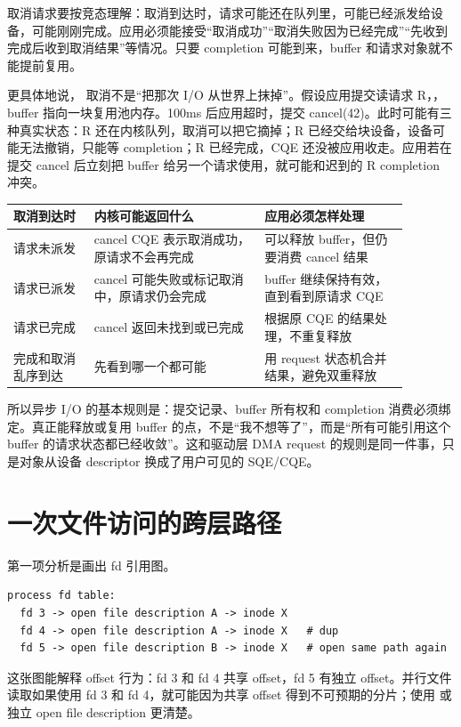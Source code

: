 取消请求要按竞态理解：取消到达时，请求可能还在队列里，可能已经派发给设备，可能刚刚完成。应用必须能接受“取消成功”“取消失败因为已经完成”“先收到完成后收到取消结果”等情况。只要 completion 可能到来，buffer 和请求对象就不能提前复用。

更具体地说， 取消不是“把那次 I/O 从世界上抹掉”。假设应用提交读请求 R，，buffer 指向一块复用池内存。100ms 后应用超时，提交 cancel(42)。此时可能有三种真实状态：R 还在内核队列，取消可以把它摘掉；R 已经交给块设备，设备可能无法撤销，只能等 completion；R 已经完成，CQE 还没被应用收走。应用若在提交 cancel 后立刻把 buffer 给另一个请求使用，就可能和迟到的 R completion 冲突。

\begin{longtable}{|p{0.18\linewidth}|p{0.38\linewidth}|p{0.32\linewidth}|}
\toprule
取消到达时 & 内核可能返回什么 & 应用必须怎样处理 \\
\midrule
请求未派发 & cancel CQE 表示取消成功，原请求不会再完成 & 可以释放 buffer，但仍要消费 cancel 结果 \\\tablerowrule
请求已派发 & cancel 可能失败或标记取消中，原请求仍会完成 & buffer 继续保持有效，直到看到原请求 CQE \\\tablerowrule
请求已完成 & cancel 返回未找到或已完成 & 根据原 CQE 的结果处理，不重复释放 \\\tablerowrule
完成和取消乱序到达 & 先看到哪一个都可能 & 用 request 状态机合并结果，避免双重释放 \\
\bottomrule
\end{longtable}

所以异步 I/O 的基本规则是：提交记录、buffer 所有权和 completion 消费必须绑定。真正能释放或复用 buffer 的点，不是“我不想等了”，而是“所有可能引用这个 buffer 的请求状态都已经收敛”。这和驱动层 DMA request 的规则是同一件事，只是对象从设备 descriptor 换成了用户可见的 SQE/CQE。

\section{一次文件访问的跨层路径}

第一项分析是画出 fd 引用图。

\begin{lstlisting}
process fd table:
  fd 3 -> open file description A -> inode X
  fd 4 -> open file description A -> inode X   # dup
  fd 5 -> open file description B -> inode X   # open same path again
\end{lstlisting}

这张图能解释 offset 行为：fd 3 和 fd 4 共享 offset，fd 5 有独立 offset。并行文件读取如果使用 fd 3 和 fd 4，就可能因为共享 offset 得到不可预期的分片；使用  或独立 open file description 更清楚。


